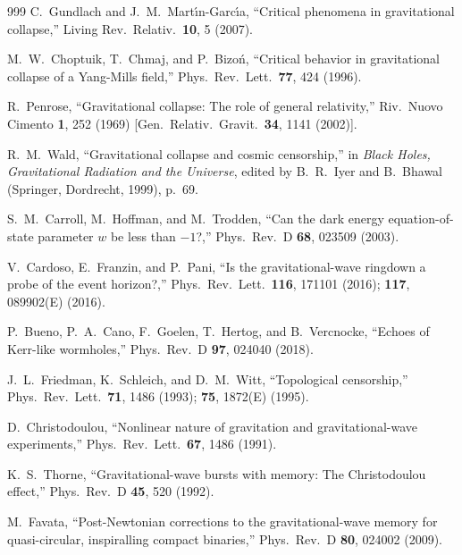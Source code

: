 \documentclass[twocolumn,floatfix,aps,prd,superscriptaddress,nofootinbib,showkeys]{revtex4-2}
\begin{document}
\begin{thebibliography}{999}
C.~Gundlach and J.~M.~Mart\'{\i}n-Garc\'{\i}a,
\newblock ``Critical phenomena in gravitational collapse,''
\newblock Living Rev.\ Relativ.\ \textbf{10}, 5 (2007).

M.~W.~Choptuik, T.~Chmaj, and P.~Bizo\'n,
\newblock ``Critical behavior in gravitational collapse of a Yang-Mills field,''
\newblock Phys.\ Rev.\ Lett.\ \textbf{77}, 424 (1996).

R.~Penrose,
\newblock ``Gravitational collapse: The role of general relativity,''
\newblock Riv.\ Nuovo Cimento \textbf{1}, 252 (1969) [Gen.\ Relativ.\ Gravit.\ \textbf{34}, 1141 (2002)].

R.~M.~Wald,
\newblock ``Gravitational collapse and cosmic censorship,''
\newblock in \emph{Black Holes, Gravitational Radiation and the Universe}, edited by B.~R.~Iyer and B.~Bhawal
\newblock (Springer, Dordrecht, 1999), p.~69.

S.~M.~Carroll, M.~Hoffman, and M.~Trodden,
\newblock ``Can the dark energy equation-of-state parameter $w$ be less than $-1$?,''
\newblock Phys.\ Rev.\ D \textbf{68}, 023509 (2003).

V.~Cardoso, E.~Franzin, and P.~Pani,
\newblock ``Is the gravitational-wave ringdown a probe of the event horizon?,''
\newblock Phys.\ Rev.\ Lett.\ \textbf{116}, 171101 (2016); \textbf{117}, 089902(E) (2016).

P.~Bueno, P.~A.~Cano, F.~Goelen, T.~Hertog, and B.~Vercnocke,
\newblock ``Echoes of Kerr-like wormholes,''
\newblock Phys.\ Rev.\ D \textbf{97}, 024040 (2018).

J.~L.~Friedman, K.~Schleich, and D.~M.~Witt,
\newblock ``Topological censorship,''
\newblock Phys.\ Rev.\ Lett.\ \textbf{71}, 1486 (1993); \textbf{75}, 1872(E) (1995).

D.~Christodoulou,
\newblock ``Nonlinear nature of gravitation and gravitational-wave experiments,''
\newblock Phys.\ Rev.\ Lett.\ \textbf{67}, 1486 (1991).

K.~S.~Thorne,
\newblock ``Gravitational-wave bursts with memory: The Christodoulou effect,''
\newblock Phys.\ Rev.\ D \textbf{45}, 520 (1992).

M.~Favata,
\newblock ``Post-Newtonian corrections to the gravitational-wave memory for quasi-circular, inspiralling compact binaries,''
\newblock Phys.\ Rev.\ D \textbf{80}, 024002 (2009).


\end{thebibliography}
\end{document}

